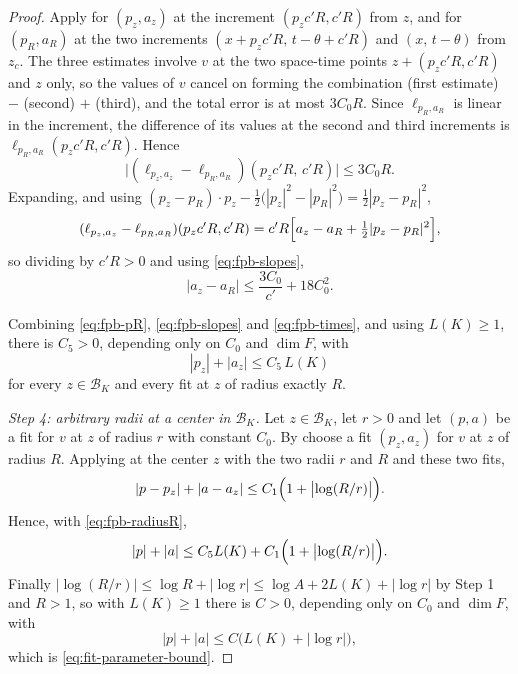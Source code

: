 \begin{proof}
Apply  for $(p_z,a_z)$ at the increment $(p_zc'R,c'R)$ from $z$,
and  for $(p_R,a_R)$ at the two increments
$(x+p_zc'R,\,t-\theta+c'R)$ and $(x,\,t-\theta)$ from $z_c$. The three
estimates involve $v$ at the two space-time points
$z+(p_zc'R,c'R)$ and $z$ only, so the values of $v$ cancel on forming the
combination (first estimate) $-$ (second) $+$ (third), and the total error is at
most $3C_0R$. Since $\ell_{p_R,a_R}$ is linear in the increment, the difference
of its values at the second and third increments is
$\ell_{p_R,a_R}(p_zc'R,c'R)$. Hence
\[
  \bigl|(\ell_{p_z,a_z}-\ell_{p_R,a_R})(p_zc'R,\,c'R)\bigr|\le3C_0R .
\]
Expanding, and using
$(p_z-p_R)\cdot p_z-\tfrac12\bigl(|p_z|^2-|p_R|^2\bigr)=\tfrac12|p_z-p_R|^2$,
\[
  (\ell_{p_z,a_z}-\ell_{p_R,a_R})(p_zc'R,c'R)
   =c'R\Bigl[a_z-a_R+\tfrac12|p_z-p_R|^2\Bigr],
\]
so dividing by $c'R>0$ and using \eqref{eq:fpb-slopes},
\begin{equation}\label{eq:fpb-times}
  |a_z-a_R|\le\frac{3C_0}{c'}+18C_0^2 .
\end{equation}

Combining \eqref{eq:fpb-pR}, \eqref{eq:fpb-slopes} and \eqref{eq:fpb-times},
and using $L(K)\ge1$, there is $C_5>0$, depending only on $C_0$ and $\dim F$,
with
\begin{equation}\label{eq:fpb-radiusR}
  |p_z|+|a_z|\le C_5\,L(K)
\end{equation}
for every $z\in\mathcal B_K$ and every fit at $z$ of radius exactly $R$.

\emph{Step 4: arbitrary radii at a center in $\mathcal B_K$.}
Let $z\in\mathcal B_K$, let $r>0$ and let $(p,a)$ be a fit for $v$ at $z$ of
radius $r$ with constant $C_0$. By  choose a fit
$(p_z,a_z)$ for $v$ at $z$ of radius $R$. Applying
 at the center $z$ with the two radii $r$ and
$R$ and these two fits,
\[
  |p-p_z|+|a-a_z|\le C_1\Bigl(1+\bigl|\log(R/r)\bigr|\Bigr).
\]
Hence, with \eqref{eq:fpb-radiusR},
\[
  |p|+|a|\le C_5L(K)+C_1\Bigl(1+\bigl|\log(R/r)\bigr|\Bigr).
\]
Finally $\bigl|\log(R/r)\bigr|\le\log R+|\log r|\le\log A+2L(K)+|\log r|$ by
Step 1 and $R>1$, so with $L(K)\ge1$ there is $C>0$, depending only on $C_0$ and
$\dim F$, with
\[
  |p|+|a|\le C\bigl(L(K)+|\log r|\bigr),
\]
which is \eqref{eq:fit-parameter-bound}.
\end{proof}
